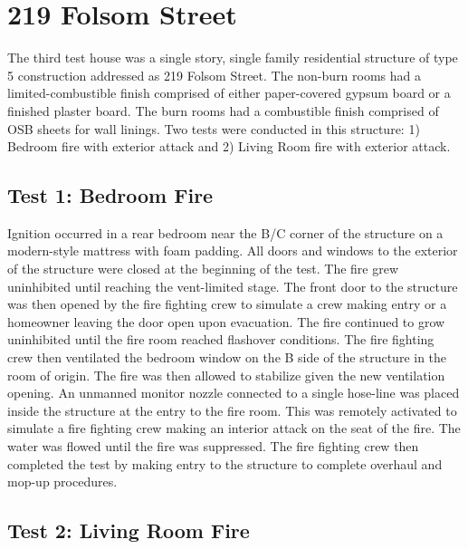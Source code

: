 \documentclass{article}
\begin{document}
\section{219 Folsom Street}

The third test house was a single story, single family residential structure of type 5 construction addressed as 219 Folsom Street. The non-burn rooms had a limited-combustible finish comprised of either paper-covered gypsum board or a finished plaster board.  The burn rooms had a combustible finish comprised of OSB sheets for wall linings.  Two tests were conducted in this structure: 1) Bedroom fire with exterior attack and 2) Living Room fire with exterior attack.    

\subsection{Test 1: Bedroom Fire}

Ignition occurred in a rear bedroom near the B/C corner of the structure on a modern-style mattress with foam padding. All doors and windows to the exterior of the structure were closed at the beginning of the test. The fire grew uninhibited until reaching the vent-limited stage.  The front door to the structure was then opened by the fire fighting crew to simulate a crew making entry or a homeowner leaving the door open upon evacuation. The fire continued to grow uninhibited until the fire room reached flashover conditions. The fire fighting crew then ventilated the bedroom window on the B side of the structure in the room of origin. The fire was then allowed to stabilize given the new ventilation opening. An unmanned monitor nozzle connected to a single hose-line was placed inside the structure at the entry to the fire room.  This was remotely activated to simulate a fire fighting crew making an interior attack on the seat of the fire.  The water was flowed until the fire was suppressed. The fire fighting crew then completed the test by making entry to the structure to complete overhaul and mop-up procedures. 

\subsection{Test 2: Living Room Fire}
  
\end{document}
